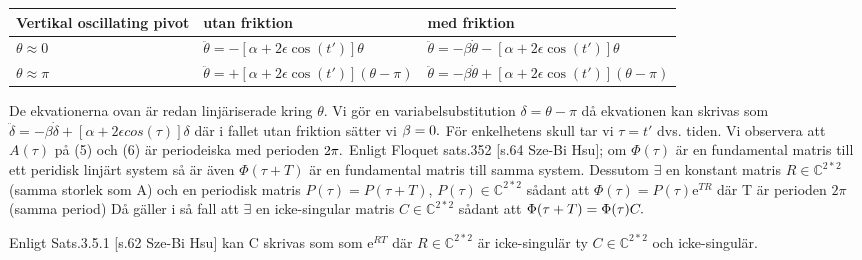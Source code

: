 \documentclass{article}
\begin{document}
\begin{center}
    \begin{tabular}{| l | l | l |}
    \hline
    Vertikal oscillating pivot & utan friktion & med friktion \\ \hline
    $ {\theta} \approx 0 $ & $ \ddot{\theta} = -[{\alpha} + 2{\epsilon}\cos(t')]{\theta} $ & $ \ddot{\theta} = -{\beta}\dot{\theta}-[{\alpha} + 2{\epsilon}\cos(t')]{\theta} $ \\ \hline
     $ {\theta} \approx {\pi} $ & $ \ddot{\theta} = +[{\alpha} + 2{\epsilon}\cos(t')]({\theta}-{\pi}) $ & $ \ddot{\theta} = -{\beta}\dot{\theta}+[{\alpha} + 2{\epsilon}\cos(t')]({\theta}-{\pi}) $ \\ \hline
    \end{tabular}
\end{center}
De ekvationerna ovan är redan linjäriserade kring ${\theta}$. 
Vi gör en variabelsubstitution ${\delta}={\theta}-{\pi}$ då ekvationen kan skrivas som 
$\ddot{\delta}=-{\beta}\dot{\delta} + [{\alpha} + 2 {\epsilon}cos({\tau})]{\delta} $ där i fallet utan friktion sätter vi ${\beta} = 0. \newline $ För enkelhetens skull tar vi ${\tau} = t'$ dvs. tiden.
Vi observera att $A({\tau})$ på (5) och (6) är periodeiska med perioden $2{\pi}.\newline$
Enligt Floquet sats.352 [s.64 Sze-Bi Hsu]; om ${\Phi}({\tau})$ är en fundamental matris till ett peridisk linjärt system så är även ${\Phi}({\tau} + T)$ är en fundamental matris till samma system. Dessutom $\exists$ en konstant matris $R \in \mathbb{C}^{2*2}$ (samma storlek som A) och en periodisk matris $P({\tau}) = P({\tau} + T)$, $P({\tau}) \in \mathbb{C}^{2*2}$ sådant att $ {\Phi}({\tau}) =P(\tau)\mathrm{e}^{TR}$ där T är perioden $2{\pi}$ (samma period) 
\newline
Då gäller i så fall att $\exists$ en icke-singular matris $C \in \mathbb{C}^{2*2}$ sådant att ${\Phi}({\tau} + T) = {\Phi}({\tau})C. \newline$

Enligt Sats.3.5.1 [s.62 Sze-Bi Hsu] kan C skrivas som som $\mathrm{e}^{RT}$ där $R \in \mathbb{C}^{2*2}$ är icke-singulär ty $C \in \mathbb{C}^{2*2}$ och icke-singulär. \newline
\end{document}
